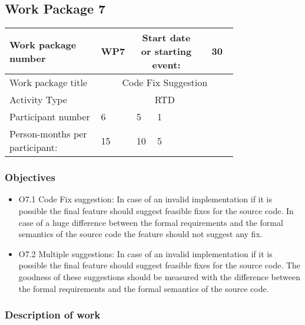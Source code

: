 \subsection{Work Package 7}

\begin{table}[hbpt]\centering
	\begin{tabular}{|p{0.35\linewidth}|p{0.06\linewidth}|p{0.06\linewidth}|p{0.06\linewidth}|
         p{0.06\linewidth}|p{0.06\linewidth}|p{0.06\linewidth}|p{0.06\linewidth}|}\hline
		 Work package number& WP7 &
		 \multicolumn{4}{|c|}{Start date or starting event:}{}&
		 \multicolumn{2}{|c|}{                        30 }{}\\\hline
		 Work package title&\multicolumn{7}{|c|}{ Code Fix Suggestion }{}\\\hline
		 Activity Type&\multicolumn{7}{|c|}{      RTD }{}\\\hline
		 Participant number & 6 & 5 & 1 & ~ & ~ & ~ & ~ \\\hline
		 Person-months per participant: & 15 & 10 & 5 & ~ & ~ & ~ & ~ \\\hline
	\end{tabular}
\end{table}

\subsubsection{Objectives}
\begin{itemize}
	\item O7.1 Code Fix suggestion: In case of an invalid implementation if it is possible the final feature should suggest feasible fixes for the source code. In case of a huge difference between the formal requirements and the formal semantics of the source code the feature should not suggest any fix.
	\item O7.2 Multiple suggestions: In case of an invalid implementation if it is possible the final feature should suggest feasible fixes for the source code. The goodness of these suggestions should be measured with the difference between the formal requirements and the formal semantics of the source code.  
\end{itemize}

\subsubsection{Description of work}

